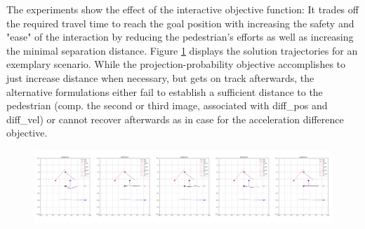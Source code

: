 The experiments show the effect of the interactive objective function: It trades off the required travel time to reach the goal position with increasing the safety and "ease" of the interaction by reducing the pedestrian's efforts as well as increasing the minimal separation distance. Figure \ref{img:interactive_comp} displays the solution trajectories for an exemplary scenario. While the projection-probability objective accomplishes to just increase distance when necessary, but gets on track afterwards, the alternative formulations either fail to establish a sufficient distance to the pedestrian (comp. the second or third image, associated with diff\_pos and diff\_vel) or cannot recover afterwards as in case for the acceleration difference objective.

\begin{figure}[!ht]
\begin{center}
\includegraphics[width=\textwidth]{images/inter_comp_multi.png}
\label{img:interactive_comp}
\end{center}
\end{figure}


